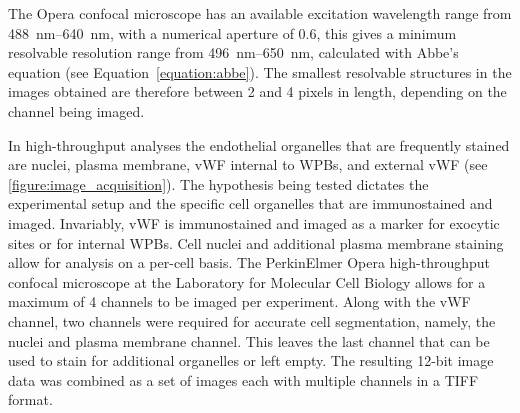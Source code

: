 The Opera confocal microscope has an available excitation wavelength range from \SIrange{488}{640}{\nano\meter}, with a numerical aperture of 0.6, this gives a minimum resolvable resolution range from \SIrange{496}{650}{\nano\meter}, calculated with Abbe's equation (see Equation~\ref{equation:abbe}). The smallest resolvable structures in the images obtained are therefore between 2 and 4 pixels in length, depending on the channel being imaged.

In high-throughput analyses the endothelial organelles that are frequently stained are nuclei, plasma membrane, vWF internal to WPBs, and external vWF (see \autoref{figure:image_acquisition}). The hypothesis being tested dictates the experimental setup and the specific cell organelles that are immunostained and imaged. Invariably, vWF is immunostained and imaged as a marker for exocytic sites or for internal WPBs. Cell nuclei and additional plasma membrane staining allow for analysis on a per-cell basis. The PerkinElmer Opera high-throughput confocal microscope at the Laboratory for Molecular Cell Biology allows for a maximum of 4 channels to be imaged per experiment. Along with the vWF channel, two channels were required for accurate cell segmentation, namely, the nuclei and plasma membrane channel. This leaves the last channel that can be used to stain for additional organelles or left empty. The resulting 12-bit image data was combined as a set of images each with multiple channels in a TIFF format.

